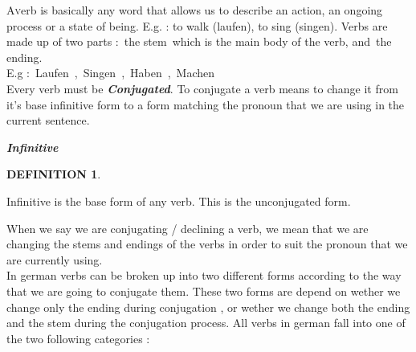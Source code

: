 \documentclass[a4paper,twocolumn,10pt]{article}
\newtheorem{mydef}{DEFINITION}[section]
\newcommand{\theworddefinition}
{ \begin{defn-theword} { \footnotesize \begin{mydef} \end{mydef} } \end{defn-theword}}
\begin{document}
\justifying
\linenumbers



\lettrine[lines=3, findent=3pt, nindent=0pt]{A} verb is basically any word that
allows us to describe an action, an ongoing process or a state of being. E.g. :
to walk (laufen), to sing (singen).  Verbs are made up of two parts : the
stem which is the main body of the verb, and the ending.\\

\noindent
E.g : Laufen , Singen , Haben , Machen\\

Every verb must be \textbf{\textit{Conjugated}}. To conjugate a verb means to
change it from it's base infinitive form to a form matching the pronoun that we
are using in the current sentence.




\vspace{0.2cm}
\centering
\nolinenumbers
\begin{defn-bg}

\label{def:infinitive}
	\begin{defn-title}[width=7cm]{}
		{\normalsize \textbf{\textit{Infinitive}} }
	\end{defn-title}

	\theworddefinition

	\begin{defn-content}
		\justify
		Infinitive is the base form of any verb. This is the unconjugated form.
	\end{defn-content}

\end{defn-bg}

\justifying
\linenumbers



When we say we are conjugating / declining a verb, we mean that we are changing
the stems and endings of the verbs in order to suit the pronoun that we are
currently using.\\

In german verbs can be broken up into two different forms according to the way
that we are going to conjugate them. These two forms are depend on wether we
change only the ending during conjugation , or wether we change both the ending
and the stem during the conjugation process. All verbs in german fall into one
of the two following categories :
\end{document}
